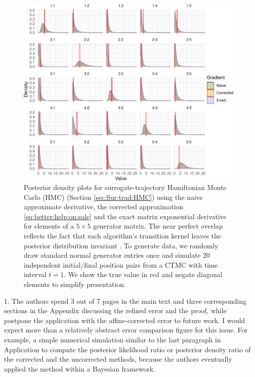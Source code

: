 \documentclass[12pt]{article}
\begin{document}
\setcounter{figure}{1}
\begin{figure}[!ht]
	\centering
	\includegraphics[width=0.6\linewidth]{figures/lowDimVis.pdf}
	\caption{Posterior density plots for surrogate-trajectory Hamiltonian Monte Carlo (HMC) (Section \ref{sec:Sur:trad:HMC}) using the naive approximate derivative, the corrected approximation \eqref{eq:better:help:on:sale} and the exact matrix exponential derivative for elements of a $5\times 5$ generator matrix. The near perfect overlap reflects the fact that each algorithm's transition kernel leaves the posterior distribution invariant \cite{glatt2020accept}.  To generate data, we randomly draw standard normal generator entries once and simulate 20 independent initial/final position pairs from a CTMC with time interval $t=1$.  We show the true value in red and negate diagonal elements to simplify presentation.  }\label{fig:lowDim}
\end{figure}

1. The authors spend 3 out of 7 pages in the main text and three corresponding sections in the Appendix discussing the refined error and the proof, while postpone the application with the affine-corrected error to future work. I would expect more than a relatively abstract error comparison figure for this issue. For example, a simple numerical simulation similar to the last paragraph in Application to compute the posterior likelihood ratio or posterior density ratio of the corrected and the uncorrected methods, because the authors eventually applied the method within a Bayesian framework.
\end{document}
